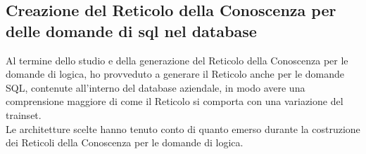 \subsection{Creazione del Reticolo della Conoscenza per delle domande di sql nel database}
\label{Creazione del Reticolo della Conoscenza per delle domande di sql nel database}
Al termine dello studio e della generazione del Reticolo della Conoscenza per le domande di logica, ho provveduto a generare il Reticolo anche per le domande SQL, contenute all'interno del database aziendale, in modo avere una comprensione maggiore di come il Reticolo si comporta con una variazione del trainset.\\
Le architetture scelte hanno tenuto conto di quanto emerso durante la costruzione dei Reticoli della Conoscenza per le domande di logica.

